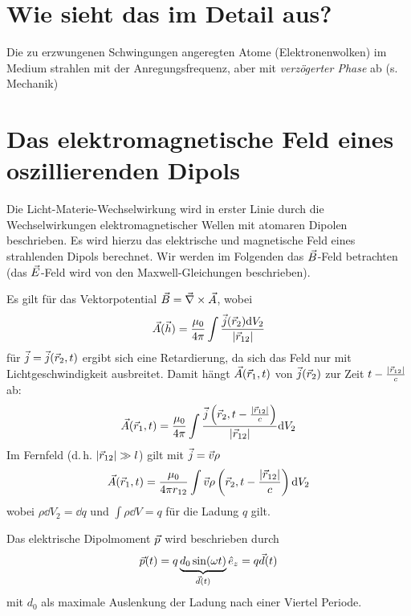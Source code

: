 
\section[Detailbetrachtung]{Wie sieht das im Detail aus?}
Die zu erzwungenen Schwingungen angeregten Atome (Elektronenwolken) im
Medium strahlen mit der Anregungsfrequenz, aber mit \emph{verzögerter
  Phase} ab (s. Mechanik)


\section{Das elektromagnetische Feld eines oszillierenden Dipols}
Die Licht-Materie-Wechselwirkung wird in erster Linie durch die
Wechselwirkungen elektromagnetischer Wellen mit atomaren Dipolen
beschrieben. Es wird hierzu das elektrische und magnetische Feld eines
strahlenden Dipols berechnet.
Wir werden im Folgenden das $\vec{B}$-Feld betrachten (das $\vec{E}$-Feld
wird von den Maxwell-Gleichungen beschrieben).

Es gilt für das Vektorpotential $\vec{B}=\vec{\nabla}\times\vec{A}$, wobei
\begin{gather*}
  \vec{A} (\vec{h}) = \frac{\mu_0}{4\pi} \int 
  \frac{\vec{j}(\vec{r}_2)\mathrm{d} V_2}{|\vec{r}_{12}|}
\end{gather*}
 für $\vec{j}=\vec{j}(\vec{r}_2,t)$ ergibt sich eine
Retardierung, da sich das Feld nur mit Lichtgeschwindigkeit
ausbreitet.
Damit hängt $\vec{A}(\vec{r}_1, t)$ von $\vec{j}(\vec{r}_2)$ zur Zeit 
$t-\frac{|\vec{r}_{12}|}{c}$ ab:
\begin{gather*}
  \vec{A}(\vec{r}_1, t) = \frac{\mu_0}{4\pi} \int
  \frac
  {\vec{j}\left( \vec{r}_2, t-\frac{|\vec{r}_{12}|}{c} \right)}
  {|\vec{r}_{12}|}
  \mathrm{d} V_2
\end{gather*}
Im Fernfeld (d.\,h. $|\vec{r}_{12}|\gg l$) gilt mit $\vec{j} = \vec{v}\rho$
\begin{gather*}
  \vec{A}(\vec{r}_1, t) = \frac{\mu_0}{4\pi r_{12}} \int
  \vec{v} \rho\left( \vec{r}_2, t-\frac{|\vec{r}_{12}|}{c} \right)
  \mathrm{d} V_2
\end{gather*}
wobei $\rho \dd V_2 = \dd q$ und $\int\rho\dd V = q$ für die Ladung $q$
gilt.

Das elektrische Dipolmoment $\vec{p}$ wird beschrieben durch
\begin{gather*}
  \vec{p}(t) = q\underbrace{d_0\sin(\omega t)}_{\vec{d}(t)}\hat{e}_z
  = q\vec{d}(t)
\end{gather*}
mit $d_0$ als maximale Auslenkung der Ladung nach einer Viertel
Periode.

